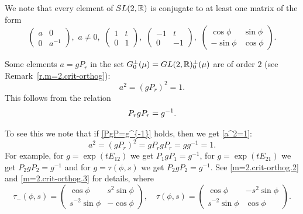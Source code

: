 \documentclass[preprint,12pt]{elsarticle}
\numberwithin{equation}{section}
\begin{document}
%
\begin{rem}
\label{r.5.5}
%
We note \cite[Chapter V, \S 8 Problems, 2, p. 147]{Knap86} that every element of   ${\rm SL}(2,{\mathbb R})$ is
conjugate to at least one matrix of the form
$$
\left(\begin{array}{cc}
 a&0\\
  0&a^{-1}
\end{array}\right),\,\,a\not=0,\,\,\left(\begin{array}{cc}
 1&t\\
  0&1
\end{array}\right),\,\,\left(\begin{array}{cc}
 -1&t\\
  0&-1
\end{array}\right),\,\,
\left(\begin{array}{cc}
\cos\phi&\sin\phi\\
-\sin\phi&\cos\phi
\end{array}
\right).
$$
\end{rem}
%
\begin{rem}
\label{r.a^2=1} 
Some elements  $a=gP_r$ in the set $G^\perp_0(\mu)={\rm GL}(2,\mathbb R)^\perp_0(\mu)$ are of order $2$ 
(see Remark~\ref{r.m=2.crit-orthog}): 
\begin{equation}
\label{a^2=1} 
a^2=(gP_r)^2=1.
\end{equation}
This follows from the relation
\begin{equation}
\label{PgP=g^{-1}} 
P_rgP_r=g^{-1}.
\end{equation}
\end{rem}
%
To see this we note that 
if \eqref{PgP=g^{-1}} holds, then we get \eqref{a^2=1}:
\begin{equation*}
a^2=(gP_r)^2=gP_rgP_r=gg^{-1}=1. 
\end{equation*}
For example, for  $g=\exp(tE_{12})$ we get $P_1gP_1=g^{-1}$, for  $g=\exp(tE_{21})$ we get $P_2gP_2=g^{-1}$
and for $g=\tau(\phi,s)$ we get $P_2gP_2=g^{-1}$.
See \eqref{m=2.crit-orthog.2}  and \eqref{m=2.crit-orthog.3} for details, where
%
\begin{equation*}
\tau_{-}(\phi,s)= \left(
\begin{array}{cc}
\cos\phi&s^2\sin\phi\\
s^{-2}\sin\phi&-\cos\phi
\end{array}
\right),\quad
\tau(\phi,s)= \left(
\begin{array}{cc}
\cos\phi&-s^2\sin\phi\\
s^{-2}\sin\phi&\cos\phi
\end{array}
\right).
\end{equation*}
\end{document}
